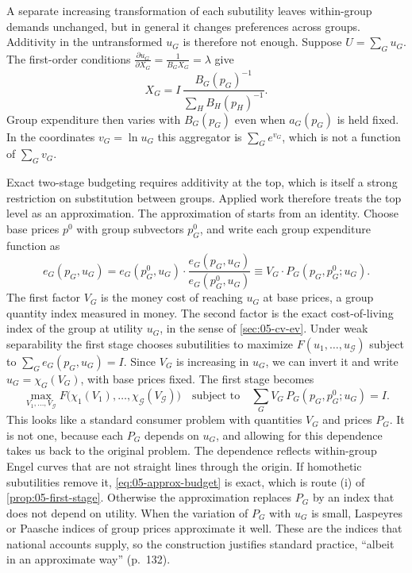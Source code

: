 A separate increasing transformation of each subutility leaves within-group demands unchanged, but in general it
changes preferences across groups. Additivity in the untransformed $u_G$ is therefore not enough. Suppose
$U = \sum_G u_G$. The first-order conditions $\frac{\partial u_G}{\partial X_G} = \frac{1}{B_G X_G} =
\lambda$ give
\begin{equation*}
  X_G = I\,\frac{B_G(p_G)^{-1}}{\sum_H B_H(p_H)^{-1}} .
\end{equation*}
Group expenditure then varies with $B_G(p_G)$ even when $a_G(p_G)$ is held fixed. In the coordinates
$v_G = \ln u_G$ this aggregator is $\sum_G e^{v_G}$, which is not a function of $\sum_G v_G$.

Exact two-stage budgeting requires additivity at the top, which is itself a strong restriction on
substitution between groups. Applied work therefore treats the top level as an approximation. The
approximation of \citet[\S 5.2, eqs.~2.18--2.19, pp.~131--132]{DeatonMuellbauer1980b} starts from an
identity. Choose base prices $p^0$ with group subvectors $p_G^0$, and write each group expenditure function
as
\begin{equation}\label{eq:05-approx-stage}
  e_G(p_G, u_G) = e_G(p_G^0, u_G)\cdot\frac{e_G(p_G, u_G)}{e_G(p_G^0, u_G)}
                \equiv V_G\cdot P_G(p_G, p_G^0; u_G).
\end{equation}
The first factor $V_G$ is the money cost of reaching $u_G$ at base prices, a group quantity index
measured in money. The second factor is the exact cost-of-living index of the group at utility $u_G$, in
the sense of \cref{sec:05-cv-ev}. Under weak separability the first stage chooses subutilities to maximize
$F(u_1, \dots, u_{\mathcal{G}})$ subject to $\sum_G e_G(p_G, u_G) = I$. Since $V_G$ is increasing in
$u_G$, we can invert it and write $u_G = \chi_G(V_G)$, with base prices fixed. The first stage becomes
\begin{equation}\label{eq:05-approx-budget}
  \max_{V_1, \dots, V_{\mathcal{G}}} F\bigl(\chi_1(V_1), \dots, \chi_{\mathcal{G}}(V_{\mathcal{G}})\bigr)
  \quad\text{subject to}\quad \sum_G V_G\, P_G(p_G, p_G^0; u_G) = I .
\end{equation}
This looks like a standard consumer problem with quantities $V_G$ and prices $P_G$. It is not one, because
each $P_G$ depends on $u_G$, and allowing for this dependence takes us back to the original problem. The
dependence reflects within-group Engel curves that are not straight lines through the origin. If
homothetic subutilities remove it, \eqref{eq:05-approx-budget} is exact, which is route (i) of
\cref{prop:05-first-stage}. Otherwise the approximation replaces $P_G$ by an index that does not depend on
utility. When the variation of $P_G$ with $u_G$ is small, Laspeyres or Paasche indices of group prices
approximate it well. These are the indices that national accounts supply, so the construction
justifies standard practice, ``albeit in an approximate way'' (p.~132).

